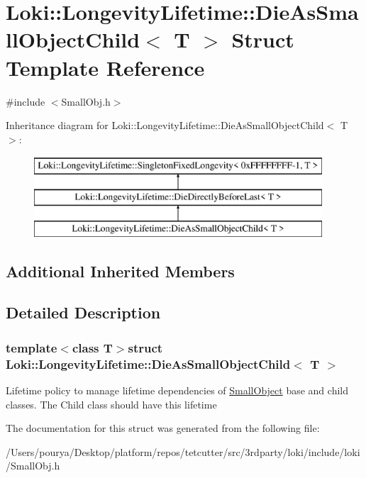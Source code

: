 \hypertarget{structLoki_1_1LongevityLifetime_1_1DieAsSmallObjectChild}{}\section{Loki\+:\+:Longevity\+Lifetime\+:\+:Die\+As\+Small\+Object\+Child$<$ T $>$ Struct Template Reference}
\label{structLoki_1_1LongevityLifetime_1_1DieAsSmallObjectChild}


{\ttfamily \#include $<$Small\+Obj.\+h$>$}

Inheritance diagram for Loki\+:\+:Longevity\+Lifetime\+:\+:Die\+As\+Small\+Object\+Child$<$ T $>$\+:\begin{figure}[H]
\begin{center}
\leavevmode
\includegraphics[height=3.000000cm]{structLoki_1_1LongevityLifetime_1_1DieAsSmallObjectChild}
\end{center}
\end{figure}
\subsection*{Additional Inherited Members}


\subsection{Detailed Description}
\subsubsection*{template$<$class T$>$struct Loki\+::\+Longevity\+Lifetime\+::\+Die\+As\+Small\+Object\+Child$<$ T $>$}

Lifetime policy to manage lifetime dependencies of \hyperlink{classLoki_1_1SmallObject}{Small\+Object} base and child classes. The Child class should have this lifetime 

The documentation for this struct was generated from the following file\+:\begin{DoxyCompactItemize}
\item 
/\+Users/pourya/\+Desktop/platform/repos/tetcutter/src/3rdparty/loki/include/loki/Small\+Obj.\+h\end{DoxyCompactItemize}
